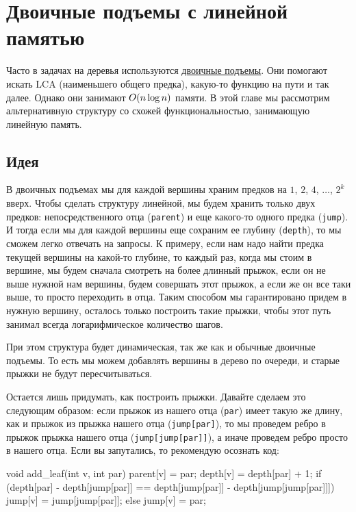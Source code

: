 \chapter{Двоичные подъемы с линейной памятью}\label{linear-binups}

Часто в задачах на деревья используются \href{https://e-maxx.ru/algo/lca_simpler}{двоичные подъемы}. Они помогают искать LCA (наименьшего общего предка), какую-то функцию на пути и так далее. Однако они занимают $O(n \log n)$ памяти. В этой главе мы рассмотрим альтернативную структуру со схожей функциональностью, занимающую линейную память.

\section{Идея}

В двоичных подъемах мы для каждой вершины храним предков на $1$, $2$, $4$, $\ldots$, $2^k$ вверх. Чтобы сделать структуру линейной, мы будем хранить только двух предков: непосредственного отца (\verb+parent+) и еще какого-то одного предка (\verb+jump+). И тогда если мы для каждой вершины еще сохраним ее глубину (\verb+depth+), то мы сможем легко отвечать на запросы. К примеру, если нам надо найти предка текущей вершины на какой-то глубине, то каждый раз, когда мы стоим в вершине, мы будем сначала смотреть на более длинный прыжок, если он не выше нужной нам вершины, будем совершать этот прыжок, а если же он все таки выше, то просто переходить в отца. Таким способом мы гарантировано придем в нужную вершину, осталось только построить такие прыжки, чтобы этот путь занимал всегда логарифмическое количество шагов.

При этом структура будет динамическая, так же как и обычные двоичные подъемы. То есть мы можем добавлять вершины в дерево по очереди, и старые прыжки не будут пересчитываться.

Остается лишь придумать, как построить прыжки. Давайте сделаем это следующим образом: если прыжок из нашего отца (\verb+par+) имеет такую же длину, как и прыжок из прыжка нашего отца (\verb+jump[par]+), то мы проведем ребро в прыжок прыжка нашего отца (\verb+jump[jump[par]]+), а иначе проведем ребро просто в нашего отца. Если вы запутались, то рекомендую осознать код:

\begin{code}
void add_leaf(int v, int par) {
    parent[v] = par;
    depth[v] = depth[par] + 1;
    if (depth[par] - depth[jump[par]] == depth[jump[par]] - depth[jump[jump[par]]]) {
        jump[v] = jump[jump[par]];
    } else {
        jump[v] = par;
    }
}
\end{code}

